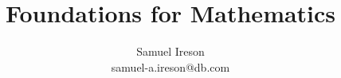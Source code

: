 

\title{Foundations for Mathematics}

\author{
Samuel Ireson\\
samuel-a.ireson@db.com
}


\maketitle






